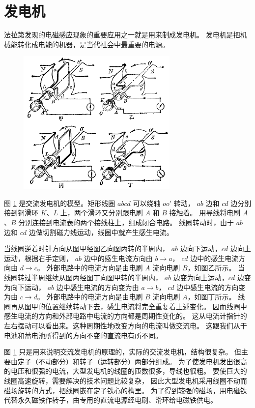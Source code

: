 \section{发电机}\label{sec:10-13}

法拉第发现的电磁感应现象的重要应用之一就是用来制成发电机。
发电机是把机械能转化成电能的机器，是当代社会中最重要的电源。

\begin{figure}[htbp]
    \centering
    \includegraphics[width=0.7\textwidth]{../pic/czwl2-ch10-47}
    \caption{}\label{fig:10-47}
\end{figure}

图 \ref{fig:10-47} 是交流发电机的模型。矩形线圈 $abcd$ 可以绕轴 $oo'$ 转动，
$ab$ 边和 $cd$ 边分别接到铜滑环 $K$、$L$ 上，两个滑环又分别跟电刷 $A$ 和 $B$ 接触着。
用导线将电刷 $A$、$B$ 分别连接到电流表的两个接线柱上，组成闭合电路。
线圈转动时，由于 $ab$ 边和 $cd$ 边做切割磁力线运动，线圈中就产生感生电流。

当线圈逆着时针方向从图甲经图乙向图丙转的半周内，
$ab$ 边向下运动，$cd$ 边向上运动，根据右手定则，
$ab$ 边中的感生电流方向由 $b \to a$，
$cd$ 边中的感生电流方向由 $d \to c$。
外部电路中的电流方向是由电刷 $A$ 流向电刷 $B$，如图乙所示。
当线圈转过半周继续从图丙经图丁向图甲转的半周内，
$ab$ 边变为向上运动，$cd$ 边变为向下运动，
$ab$ 边中感生电流的方向变为由 $a \to b$，
$cd$ 边中感生电流的方向变为由 $c \to d$。
外部电路中的电流方向是由电刷 $B$ 流向电刷 $A$，如图丁所示。
线圈再从图甲的位置继续转动下去，感生电流将完全重复着上述变化。
因而线圈中感生电流的方向和外部电路中电流的方向都是周期性变化的。
这从电流计指针的左右摆动可以看出来。这种周期性地改变方向的电流叫做交流电。
这跟我们从干电池和蓄电池所得到的方向不变的直流电有所不同。

图 \ref{fig:10-47} 只是用来说明交流发电机的原理的，实际的交流发电机，结构很复杂。
但主要由定子（不动部分）和转子（运转部分）两部分组成。
为了使发电机发出很高的电压和很强的电流，大型发电机的线圈的匝数很多，导线也很粗。
要使巨大的线圈高速旋转，需要解决的技术问题比较复杂，
因此大型发电机采用线圈不动而磁场旋转的方式，把线圈嵌在定子铁心的槽里。
为了得到较强的磁场，用电磁铁代替永久磁铁作转子，由专用的直流电源经电刷、滑环给电磁铁供电。

